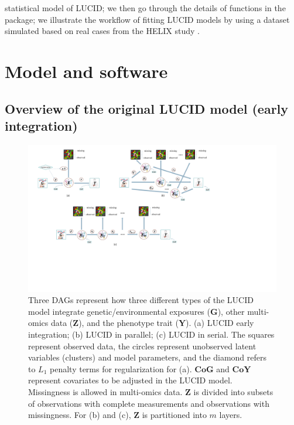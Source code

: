 statistical model of LUCID; we then go through the details of functions in the  package; we illustrate the workflow of fitting LUCID models by using a dataset simulated based on real cases from the HELIX study \citep{vrijheid2014human, maitre2022state}.


\section{Model and software} \label{sec2}

\subsection{Overview of the original LUCID model (early integration)} \label{sec2.1}

\begin{figure}
    \centering
    \includegraphics[scale = 0.31]{figures/fig1.pdf}
    \caption{Three DAGs represent how three different types of the LUCID model integrate genetic/environmental exposures ($\bm G$), other multi-omics data ($\bm Z$), and the phenotype trait ($\bm Y$). (a) LUCID early integration; (b) LUCID in parallel; (c) LUCID in serial. The squares represent observed data, the circles represent unobserved latent variables (clusters) and model parameters, and the diamond refers to $L_1$ penalty terms for regularization for (a). $\bm {CoG}$ and $\bm {CoY}$ represent covariates to be adjusted in the LUCID model. Missingness is allowed in multi-omics data. $\bm Z$ is divided into subsets of observations with complete measurements and observations with missingness. For (b) and (c), $\bm Z$ is partitioned into $m$ layers.}
    \label{fig1}
\end{figure}

